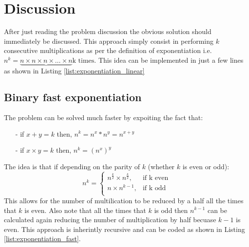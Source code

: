 \section{Discussion}
\label{exponentiation:sec:discussion}
After just reading the problem discussion the obvious solution should immediately be discussed. This approach simply consist in performing $k$ consecutive multiplications as per the definition of exponentiation i.e. $n^k = \underbrace{n \times n \times n \times \ldots \times n}\text{k times}$. This idea can be implemented in just a few lines as shown in Listing \ref{list:exponentiation_linear}



\subsection{Binary fast exponentiation}
\label{exponentiation:sec:fast_exponentiation}
The problem can be solved much faster by expoiting the fact that:
\begin{itemize}
	\item[-] if $x+y=k$ then, $n^k = n^x * n^y = n^{x+y}$ 
	\item[-] if $x \times y=k$ then, $n^k = (n^x)^y$
\end{itemize}
The idea is that if depending on the parity of $k$ (whether $k$ is even or odd):
  \[
    n^k = \begin{cases}
        		n^{\frac{k}{2}} \times n^{\frac{k}{2}}, & \text{if  k even}\\
        		n \times n^{k-1}, & \text{if k odd}\\
	        \end{cases}
  \]
This allows for the number of multilication to be reduced by a half all the times that $k$ is even. Also note that all the times that $k$ is odd then $n^{k-1}$ can be calculated again reducing the number of multiplication by half becuase $k-1$ is even. This approach is inherintly recursive and can be coded as shown in Listing \ref{list:exponentiation_fast}.




